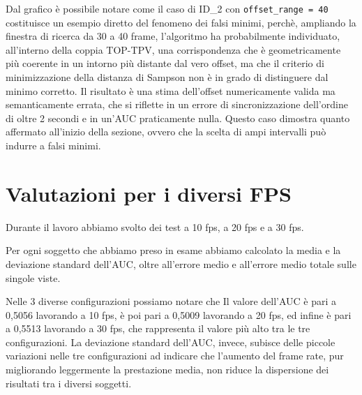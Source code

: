 \begin{flushleft}
Dal grafico è possibile notare come il caso di ID\_2 con \texttt{offset\_range = 40} costituisce un esempio diretto del fenomeno dei falsi minimi, perchè, ampliando la finestra di ricerca da 30 a 40 frame, l'algoritmo ha probabilmente individuato, all'interno della coppia TOP-TPV, una corrispondenza che è geometricamente più coerente in un intorno più distante dal vero offset, ma che il criterio di minimizzazione della distanza di Sampson non è in grado di distinguere dal minimo corretto. Il risultato è una stima dell'offset numericamente valida ma semanticamente errata, che si riflette in un errore di sincronizzazione dell'ordine di oltre 2 secondi e in un'AUC praticamente nulla. Questo caso dimostra quanto affermato all'inizio della sezione, ovvero che la scelta di ampi intervalli può indurre a falsi minimi.
\end{flushleft}

\section{Valutazioni per i diversi FPS}
Durante il lavoro abbiamo svolto dei test a 10 fps, a 20 fps e a 30 fps. 


Per ogni soggetto che abbiamo preso in esame abbiamo calcolato la media e la deviazione standard dell'AUC, oltre all'errore medio e all'errore medio totale sulle singole viste.


Nelle 3 diverse configurazioni possiamo notare che Il valore dell'AUC è pari a 0,5056 lavorando a 10 fps, è poi pari a 0,5009 lavorando a 20 fps, ed infine è pari a 0,5513 lavorando a 30 fps, che rappresenta il valore più alto tra le tre configurazioni.
La deviazione standard dell'AUC, invece, subisce delle piccole variazioni nelle tre configurazioni ad indicare che l'aumento del frame rate, pur migliorando leggermente la prestazione media, non riduce la dispersione dei risultati tra i diversi soggetti. 


